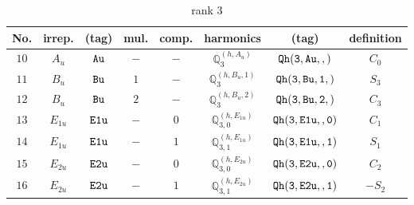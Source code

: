 \documentclass[fleqn,8pt]{jsarticle}
\begin{document}
\begin{table}[ht!]
\begin{center}
\caption{rank 3}
\renewcommand{\arraystretch}{1.3}
\begin{tabular}{cccccccc} \hline \hline
No. & irrep. & (tag) & mul. & comp. & harmonics & (tag) & definition \\ \hline
$ 10 $ & $ A_{u} $ & $ {\tt Au} $ & $ - $ & $ - $ & $ \mathbb{Q}_{3}^{(h,A_{u})} $ & $ {\tt Qh(3,Au,,)} $ & $ C_{0} $ \\
$ 11 $ & $ B_{u} $ & $ {\tt Bu} $ & $ 1 $ & $ - $ & $ \mathbb{Q}_{3}^{(h,B_{u},1)} $ & $ {\tt Qh(3,Bu,1,)} $ & $ S_{3} $ \\
$ 12 $ & $ B_{u} $ & $ {\tt Bu} $ & $ 2 $ & $ - $ & $ \mathbb{Q}_{3}^{(h,B_{u},2)} $ & $ {\tt Qh(3,Bu,2,)} $ & $ C_{3} $ \\
$ 13 $ & $ E_{1u} $ & $ {\tt E1u} $ & $ - $ & $ 0 $ & $ \mathbb{Q}_{3,0}^{(h,E_{1u})} $ & $ {\tt Qh(3,E1u,,0)} $ & $ C_{1} $ \\
$ 14 $ & $ E_{1u} $ & $ {\tt E1u} $ & $ - $ & $ 1 $ & $ \mathbb{Q}_{3,1}^{(h,E_{1u})} $ & $ {\tt Qh(3,E1u,,1)} $ & $ S_{1} $ \\
$ 15 $ & $ E_{2u} $ & $ {\tt E2u} $ & $ - $ & $ 0 $ & $ \mathbb{Q}_{3,0}^{(h,E_{2u})} $ & $ {\tt Qh(3,E2u,,0)} $ & $ C_{2} $ \\
$ 16 $ & $ E_{2u} $ & $ {\tt E2u} $ & $ - $ & $ 1 $ & $ \mathbb{Q}_{3,1}^{(h,E_{2u})} $ & $ {\tt Qh(3,E2u,,1)} $ & $ - S_{2} $ \\
 \hline \hline
\end{tabular}
\end{center}
\end{table}
\end{document}
